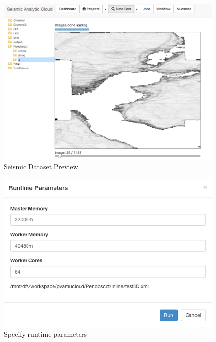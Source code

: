\begin{figure}[H]
\centering
\includegraphics[scale=.45]{figures/DataSet.png}
\caption{Seismic Dataset Preview}
\label{DataSet}
\end{figure}

\begin{figure}[H]
\centering
\includegraphics[scale=.60]{figures/Runtime.png}
\caption{Specify runtime parameters}
\label{Runtime}
\end{figure}


